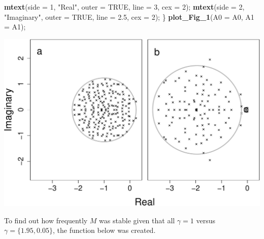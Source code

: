 \documentclass[]{article}
\newenvironment{Shaded}{\begin{snugshade}}{\end{snugshade}}
\newcommand{\KeywordTok}[1]{\textcolor[rgb]{0.13,0.29,0.53}{\textbf{{#1}}}}
\newcommand{\DataTypeTok}[1]{\textcolor[rgb]{0.13,0.29,0.53}{{#1}}}
\newcommand{\DecValTok}[1]{\textcolor[rgb]{0.00,0.00,0.81}{{#1}}}
\newcommand{\FloatTok}[1]{\textcolor[rgb]{0.00,0.00,0.81}{{#1}}}
\newcommand{\StringTok}[1]{\textcolor[rgb]{0.31,0.60,0.02}{{#1}}}
\newcommand{\OtherTok}[1]{\textcolor[rgb]{0.56,0.35,0.01}{{#1}}}
\newcommand{\NormalTok}[1]{{#1}}
\begin{document}
\begin{Shaded}
\begin{Highlighting}[]
    \KeywordTok{mtext}\NormalTok{(}\DataTypeTok{side =} \DecValTok{1}\NormalTok{, }\StringTok{"Real"}\NormalTok{, }\DataTypeTok{outer =} \OtherTok{TRUE}\NormalTok{, }\DataTypeTok{line =} \DecValTok{3}\NormalTok{, }\DataTypeTok{cex =} \DecValTok{2}\NormalTok{);}
    \KeywordTok{mtext}\NormalTok{(}\DataTypeTok{side =} \DecValTok{2}\NormalTok{, }\StringTok{"Imaginary"}\NormalTok{, }\DataTypeTok{outer =} \OtherTok{TRUE}\NormalTok{, }\DataTypeTok{line =} \FloatTok{2.5}\NormalTok{, }\DataTypeTok{cex =} \DecValTok{2}\NormalTok{);}
\NormalTok{\}}
\KeywordTok{plot_Fig_1}\NormalTok{(}\DataTypeTok{A0 =} \NormalTok{A0, }\DataTypeTok{A1 =} \NormalTok{A1);}
\end{Highlighting}
\end{Shaded}

\includegraphics{unnamed-chunk-4-1.pdf}

To find out how frequently \(M\) was stable given that all
\(\gamma = 1\) versus \(\gamma = \{1.95, 0.05\}\), the function below
was created.
\end{document}

